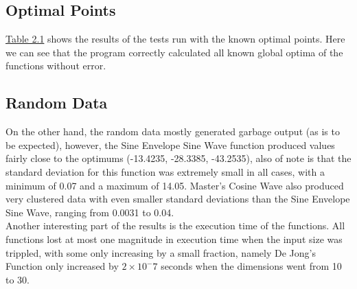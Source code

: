 \documentclass[paper=a4, fontsize=11pt]{scrartcl} %
\numberwithin{equation}{section} %
\numberwithin{figure}{section} %
\numberwithin{table}{section} %
\begin{document}
	\subsection{Optimal Points}
	\hyperref[T1]{Table 2.1} shows the results of the tests run with the known optimal points. Here we can see that the program correctly calculated all known global optima of the functions without error. 
		
	\subsection{Random Data}
	On the other hand, the random data mostly generated garbage output (as is to be expected), however, the Sine Envelope Sine Wave function produced values fairly close to the optimums (-13.4235, -28.3385, -43.2535), also of note is that the standard deviation for this function was extremely small in all cases, with a minimum of 0.07 and a maximum of 14.05. Master's Cosine Wave also produced very clustered data with even smaller standard deviations than the Sine Envelope Sine Wave, ranging from 0.0031 to 0.04.\\ Another interesting part of the results is the execution time of the functions. All functions lost at most one magnitude in execution time when the input size was trippled, with some only increasing by a small fraction, namely De Jong's Function only increased by $2\times10^-7$ seconds when the dimensions went from 10 to 30. \\
	
\end{document}
